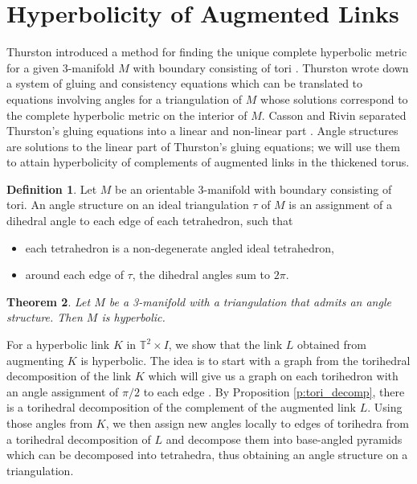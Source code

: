 \documentclass[11pt]{amsart}
\newcommand{\prpref}[1]{Proposition \ref{#1}}
\newcommand{\torus}{{\mathbb{T}^2}}
\theoremstyle{plain}
\newtheorem{theorem}{Theorem}[section]
\theoremstyle{definition}
\newtheorem{define}[theorem]{Definition}
\begin{document}
\section{Hyperbolicity of Augmented Links}
\label{s:hyperbolicity}
Thurston introduced a method for finding the
unique complete hyperbolic metric for a given 3-manifold $M$
with boundary consisting of tori \cite{Thurston}. 
Thurston wrote down a system of gluing and consistency equations
which can be translated to equations involving
angles for a triangulation of $M$ whose solutions correspond to the
complete hyperbolic metric on the interior of $M$.
Casson and Rivin separated Thurston's
gluing equations into a linear and non-linear part \cite{Casson-Rivin}.
Angle structures are solutions to the linear part of
Thurston's gluing equations;
we will use them to attain hyperbolicity of complements
of augmented links in the thickened torus.


\begin{define}
Let $M$ be an orientable 3-manifold with boundary consisting of tori. An angle
structure on an ideal triangulation $\tau$ of $M$ is an assignment of a dihedral
angle to each edge of each tetrahedron, such that
\begin{itemize}
\item each tetrahedron is a non-degenerate angled ideal tetrahedron,
\item around each edge of $\tau$, the dihedral angles sum to $2\pi$.
\end{itemize}
\end{define}



\begin{theorem}\cite[Theorem 1.1]{FG-angles}
\label{t:hyperbolic-angle-str}
Let $M$ be a 3-manifold with a triangulation that admits an angle structure.
Then $M$ is hyperbolic.
\end{theorem}


For a hyperbolic link $K$ in $\torus \times I$, we show
that the link $L$ obtained from augmenting $K$ is hyperbolic.
The idea is to start with a graph from the torihedral decomposition
of the link $K$ which will give us a graph on each torihedron with an angle
assignment of $\pi/2$ to each edge \cite{CKP2}.
By \prpref{p:tori_decomp},
there is a torihedral decomposition of the complement of the augmented link $L$.
Using those angles from $K$,
we then assign new angles locally to edges of torihedra from a torihedral 
decomposition of $L$
and decompose them into base-angled pyramids which can be decomposed 
into tetrahedra, thus obtaining an angle structure on a triangulation.
\end{document}
